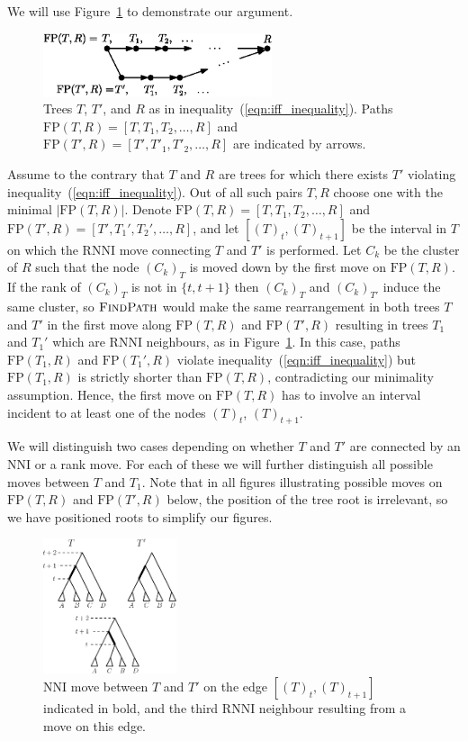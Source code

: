 \documentclass[11pt]{amsart}
\newcommand{\rnni}{\mathrm{RNNI}}
\newcommand{\findpath}{\textsc{FindPath}}
\newcommand{\nni}{\mathrm{NNI}}
\newcommand{\fp}{\mathrm{FP}}
\begin{document}
We will use Figure~\ref{fig:proof_idea} to demonstrate our argument.

\begin{figure}[ht]
\centering
\includegraphics[width=0.6\textwidth]{proof_idea_ag}
\caption{Trees $T$, $T'$, and $R$ as in inequality~(\ref{eqn:iff_inequality}).
Paths $\fp(T,R) = [T,T_1,T_2, \ldots, R]$ and $\fp(T',R) = [T',T'_1,T'_2, \ldots, R]$ are indicated by arrows.}
\label{fig:proof_idea}
\end{figure}

Assume to the contrary that $T$ and $R$ are trees for which there exists $T'$ violating inequality~(\ref{eqn:iff_inequality}).
Out of all such pairs $T, R$ choose one with the minimal $|\fp(T, R)|$.
Denote $\fp(T,R) = [T, T_1, T_2, \ldots, R]$ and $\fp(T', R) = [T', T_1', T_2', \ldots, R]$, and let $[(T)_t, (T)_{t+1}]$ be the interval in $T$ on which the $\rnni$ move connecting $T$ and $T'$ is performed.
Let $C_k$ be the cluster of $R$ such that the node $(C_k)_T$ is moved down by the first move on $\fp(T, R)$.
If the rank of $(C_k)_T$ is not in $\{t, t+1\}$ then $(C_k)_T$ and $(C_k)_{T'}$ induce the same cluster, so $\findpath$ would make the same rearrangement in both trees $T$ and $T'$ in the first move along $\fp(T, R)$ and $\fp(T', R)$ resulting in trees $T_1$ and $T_1'$ which are $\rnni$ neighbours, as in Figure~\ref{fig:proof_idea}.
In this case, paths $\fp(T_1, R)$ and $\fp(T_1', R)$ violate inequality~(\ref{eqn:iff_inequality}) but $\fp(T_1, R)$ is strictly shorter than $\fp(T, R)$, contradicting our minimality assumption.
Hence, the first move on $\fp(T, R)$ has to involve an interval incident to at least one of the nodes $(T)_t$, $(T)_{t+1}$.

We will distinguish two cases depending on whether $T$ and $T'$ are connected by an $\nni$ or a rank move.
For each of these we will further distinguish all possible moves between $T$ and $T_1$.
Note that in all figures illustrating possible moves on $\fp(T,R)$ and $\fp(T',R)$ below, the position of the tree root is irrelevant, so we have positioned roots to simplify our figures.

\begin{figure}[ht]
\centering
\includegraphics[width=0.35\textwidth]{thm_fp_nni1}
\caption{$\nni$ move between $T$ and $T'$ on the edge $[(T)_t,(T)_{t+1}]$ indicated in bold, and the third $\rnni$ neighbour resulting from a move on this edge.}
\label{fig:thm_fp_nni1}
\end{figure}
\end{document}
